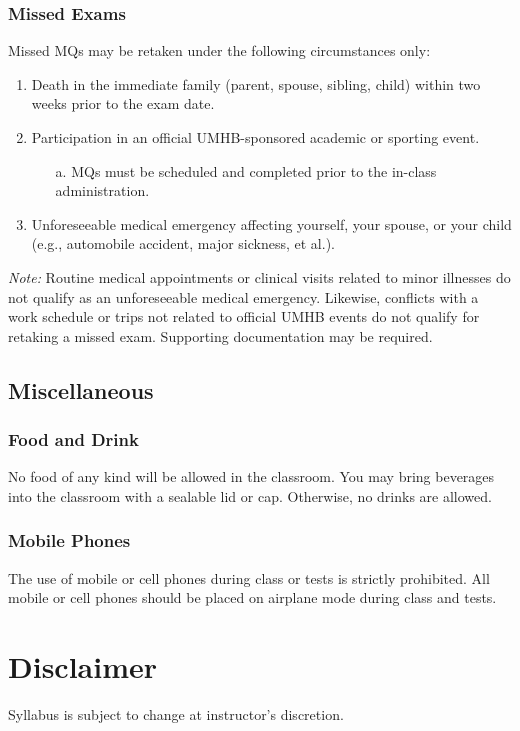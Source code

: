 \documentclass[article]{article}
\begin{document}
\subsubsection{Missed Exams} \label{sec:missedexams}
Missed MQs may be retaken under the following circumstances only:
\begin{enumerate}
\item Death in the immediate family (parent, spouse, sibling, child) within two weeks prior to the exam date.
\item Participation in an official UMHB-sponsored academic or sporting event.
\begin{itemize}
\item[a.] MQs must be scheduled and completed prior to the in-class administration.
\end{itemize}
\item Unforeseeable medical emergency affecting yourself, your spouse, or your child (e.g., automobile accident, major sickness, et al.).
\end{enumerate}

{\em{Note:}} Routine medical appointments or clinical visits related to minor illnesses do not qualify as an unforeseeable medical emergency.  Likewise, conflicts with a work schedule or trips not related to official UMHB events do not qualify for retaking a missed exam.  Supporting documentation may be required.

\subsection{Miscellaneous} \label{sec:misc}

\subsubsection{Food and Drink} \label{sec:food}
No food of any kind will be allowed in the classroom. You may bring beverages into the classroom with a sealable lid or cap. Otherwise, no drinks are allowed.

\subsubsection{Mobile Phones} \label{sec:phones}
The use of mobile or cell phones during class or tests is strictly prohibited. All mobile or cell phones should be placed on airplane mode during class and tests.

\section{Disclaimer}
Syllabus is subject to change at instructor's discretion.\\
	
\end{document}
